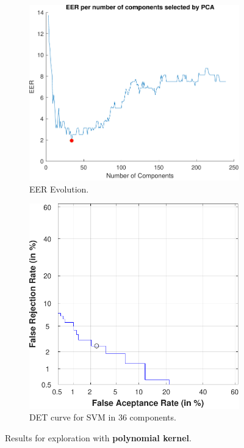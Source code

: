 \documentclass[a4paper]{article}
\begin{document}
\begin{enumerate}
\begin{figure}[H]
  \centering
       \begin{subfigure}[t]{0.45\textwidth}
         \centering
         \includegraphics[scale=0.5]{Figures/SVM-POLY-1TOMAX}
         \caption{EER Evolution.}
     \end{subfigure}%
     \quad
     \begin{subfigure}[t]{0.45\textwidth}
         \centering
         \includegraphics[scale=0.5]{Figures/SVM-POLY-OPTIMPCA}
         \caption{DET curve for SVM in \(36\) components.}
     \end{subfigure}
    \caption{Results for exploration with \textbf{polynomial kernel}.}
    \label{fig:extra:poly:all}
\end{figure}


\end{enumerate}
\end{document}
